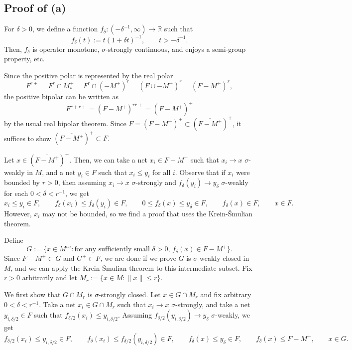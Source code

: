 \documentclass{../../../../small}
\begin{document}
\subsection{Proof of (a)}


\begin{defn*}
For $\delta>0$, we define a function $f_\delta:(-\delta^{-1},\infty)\to\mathbb{R}$ such that
\[f_\delta(t):=t(1+\delta t)^{-1},\qquad t>-\delta^{-1}.\]
Then, $f_\delta$ is operator monotone, $\sigma$-strongly continuous, and enjoys a semi-group property, etc.
\end{defn*}

\begin{pf}
Since the positive polar is represented by the real polar
\[F^{r+}=F^r\cap M_*^+=F^r\cap(-M^+)^r=(F\cup-M^+)^r=(F-M^+)^r,\]
the positive bipolar can be written as
\[F^{r+r+}=(F-M^+)^{rr+}=(\overline{F-M^+})^+\]
by the usual real bipolar theorem.
Since $F=(F-M^+)^+\subset(\overline{F-M^+})^+$, it suffices to show $(\overline{F-M^+})^+\subset F$.

Let $x\in(\overline{F-M^+})^+$.
Then, we can take a net $x_i\in F-M^+$ such that $x_i\to x$ $\sigma$-weakly in $M$, and a net $y_i\in F$ such that $x_i\le y_i$ for all $i$.
Observe that if $x_i$ were bounded by $r>0$, then assuming $x_i\to x$ $\sigma$-strongly and $f_\delta(y_i)\to y_\delta$ $\sigma$-weakly for each $0<\delta<r^{-1}$, we get
\[x_i\le y_i\in F,\qquad f_\delta(x_i)\le f_\delta(y_i)\in F,\qquad 0\le f_\delta(x)\le y_\delta\in F,\qquad f_\delta(x)\in F,\qquad x\in F.\]
However, $x_i$ may not be bounded, so we find a proof that uses the Krein-\v Smulian theorem.

Define
\[G:=\{x\in M^{sa}:\text{for any sufficiently small $\delta>0$, $f_\delta(x)\in F-M^+$}\}.\]
Since $F-M^+\subset G$ and $G^+\subset F$, we are done if we prove $G$ is $\sigma$-weakly closed in $M$, and we can apply the Krein-\v Smulian theorem to this intermediate subset.
Fix $r>0$ arbitrarily and let $M_r:=\{x\in M:\|x\|\le r\}$.

We first show that $G\cap M_r$ is $\sigma$-strongly closed.
Let $x\in\overline{G\cap M_r}$ and fix arbitrary $0<\delta<r^{-1}$.
Take a net $x_i\in G\cap M_r$ such that $x_i\to x$ $\sigma$-strongly, and take a net $y_{i,\delta/2}\in F$ such that $f_{\delta/2}(x_i)\le y_{i,\delta/2}$.
Assuming $f_{\delta/2}(y_{i,\delta/2})\to y_\delta$ $\sigma$-weakly, we get
\[f_{\delta/2}(x_i)\le y_{i,\delta/2}\in F,\qquad f_\delta(x_i)\le f_{\delta/2}(y_{i,\delta/2})\in F,\qquad f_\delta(x)\le y_\delta\in F,\qquad f_\delta(x)\le F-M^+,\qquad x\in G.\]


\end{pf}
\end{document}
